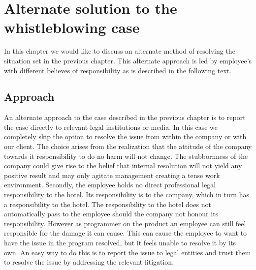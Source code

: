 \chapter{Alternate solution to the whistleblowing case}
In this chapter we would like to discuss an alternate method of resolving the situation set in the previous chapter. This alternate approach is led by employee's with different believes of responsibility as is described in the following text.

\section{Approach}
An alternate approach to the case described in the previous chapter is to report the case directly to relevant legal institutions or media. In this case we completely skip the option to resolve the issue from within the company or with our client.
The choice arises from the realization that the attitude of the company towards it responsibility to do no harm will not change. The stubbornness of the company could give rise to the belief that internal resolution will not yield any positive result and may only agitate management creating a tense work environment. 
Secondly, the employee holds no direct professional legal responsibility to the hotel. Its responsibility is to the company, which in turn has a responsibility to the hotel. The responsibility to the hotel does not automatically pass to the employee should the company not honour its responsibility. 
However as programmer on the product an employee can still feel responsible for the damage it can cause. This can cause the employee to want to have the issue in the program resolved, but it feels unable to resolve it by its own. An easy way to do this is to report the issue to legal entities and trust them to resolve the issue by addressing the relevant litigation. 

